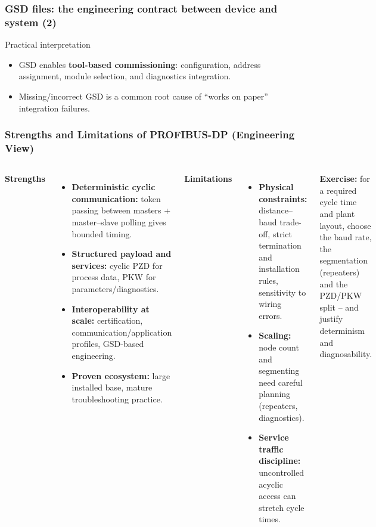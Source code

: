 \begin{frame}
	\frametitle{GSD files: the engineering contract between device and system (2)}
	\begin{block}{Practical interpretation}
		\begin{itemize}
			\item GSD enables \textbf{tool-based commissioning}: configuration, address assignment, module selection, and diagnostics integration.
			\item Missing/incorrect GSD is a common root cause of ``works on paper'' integration failures.
		\end{itemize}
	\end{block}
\end{frame}
\begin{frame}
	\frametitle{Strengths and Limitations of PROFIBUS-DP (Engineering View)}
	\small
	\begin{columns}[T,onlytextwidth]
		\textbf{Strengths}
		\begin{itemize}
			\item \textbf{Deterministic cyclic communication:} token passing between masters + master--slave polling gives bounded timing.
			\item \textbf{Structured payload and services:} cyclic PZD for process data, PKW for parameters/diagnostics.
			\item \textbf{Interoperability at scale:} certification, communication/application profiles, GSD-based engineering.
			\item \textbf{Proven ecosystem:} large installed base, mature troubleshooting practice.
		\end{itemize}
		\textbf{Limitations}
		\begin{itemize}
			\item \textbf{Physical constraints:} distance--baud trade-off, strict termination and installation rules, sensitivity to wiring errors.
			\item \textbf{Scaling:} node count and segmenting need careful planning (repeaters, diagnostics).
			\item \textbf{Service traffic discipline:} uncontrolled acyclic access can stretch cycle times.
		\end{itemize}
		\footnotesize\textbf{Exercise:} for a required cycle time and plant layout, choose the baud rate, the segmentation (repeaters) and the PZD/PKW split -- and justify determinism and diagnosability.
	\end{columns}
\end{frame}
